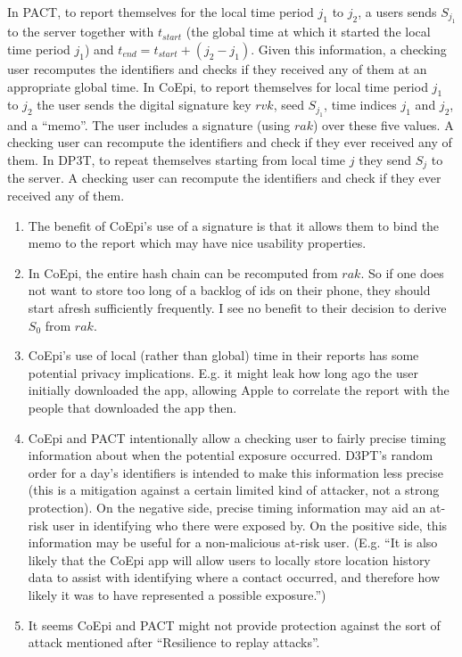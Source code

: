 \documentclass{article}
\begin{document}
In PACT, to report themselves for the local time period $j_1$ to $j_2$, a users sends $S_{j_1}$ to the server together with $t_{start}$ (the global time at which it started the local time period $j_1$) and $t_{end}=t_{start}+(j_2-j_1)$. Given this information, a checking user recomputes the identifiers and checks if they received any of them at an appropriate global time.
In CoEpi, to report themselves for local time period $j_1$ to $j_2$ the user sends the digital signature key $rvk$, seed $S_{j_1}$, time indices $j_1$ and $j_2$, and a ``memo''. The user includes a signature (using $rak$) over these five values. A checking user can recompute the identifiers and check if they ever received any of them.
In DP3T, to repeat themselves starting from local time $j$ they send $S_j$ to the server. A checking user can recompute the identifiers and check if they ever received any of them.

\begin{enumerate}
	\item The benefit of CoEpi's use of a signature is that it allows them to bind the memo to the report which may have nice usability properties.
	\item In CoEpi, the entire hash chain can be recomputed from $rak$. So if one does not want to store too long of a backlog of ids on their phone, they should start afresh sufficiently frequently. I see no benefit to their decision to derive $S_0$ from $rak$.
	\item CoEpi's use of local (rather than global) time in their reports has some potential privacy implications. E.g. it might leak how long ago the user initially downloaded the app, allowing Apple to correlate the report with the people that downloaded the app then.
	\item CoEpi and PACT intentionally allow a checking user to fairly precise timing information about when the potential exposure occurred. D3PT's random order for a day's identifiers is intended to make this information less precise (this is a mitigation against a certain limited kind of attacker, not a strong protection). On the negative side, precise timing information may aid an at-risk user in identifying who there were exposed by. On the positive side, this information may be useful for a non-malicious at-risk user. (E.g. ``It is also likely that the CoEpi app will allow users to locally store location history data to assist with identifying where a contact occurred, and therefore how likely it was to have represented a possible exposure.'')
	\item It seems CoEpi and PACT might not provide protection against the sort of attack mentioned after ``Resilience to replay attacks''.
\end{enumerate}
\end{document}
